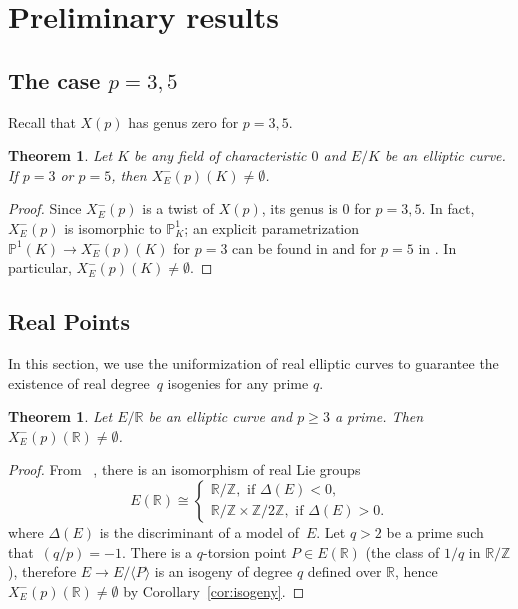 \documentclass[12pt]{amsart}
\numberwithin{equation}{section}
\newtheorem{theorem}[equation]{Theorem}
\theoremstyle{definition}
\newcommand{\PP}{\mathbb{P}}
\newcommand{\R}{\mathbb{R}}
\newcommand{\Z}{\mathbb{Z}}
\newcommand{\Xp}{X_E^{-}(p)}
\begin{document}
\section{Preliminary results}

\subsection{The case \texorpdfstring{$p=3,5$}{}}\label{sec:p=3,5}
Recall that $X(p)$ has genus zero for $p=3,5$.

\begin{theorem}\label{thm:p=3}
Let $K$ be any field of characteristic $0$ and $E/K$ be an elliptic curve.
If $p=3$ or $p=5$, then $X_E^{-}(p)(K)\neq \emptyset$.
\end{theorem}
\begin{proof}
Since $\Xp$ is a twist of $X(p)$, its genus is 0 for $p=3,5$. In fact, $\Xp$ is isomorphic to $\PP^1_K$; 
an explicit parametrization $\mathbb P^1(K)\to   X_E^{-}(p)(K)$ for $p=3$ can be found in \cite[\S 13]{fisher} and for $p=5$ in \cite[Theorem 5.8]{fisherp5}. In particular, $X_E^{-}(p)(K)\neq \emptyset$.
\end{proof}

\subsection{Real Points} \label{sectionreal}
In this section, we use the uniformization of real elliptic curves to guarantee the existence of real degree~$q$ isogenies for any prime $q$.
	\begin{theorem}\label{thm:real}
		Let $E/\R$ be an elliptic curve and $p \geq 3$ a prime. Then
		$\Xp(\R)\neq \emptyset$.
	\end{theorem}
	\begin{proof}
	From ~\cite[Ch V, Cor~2.3.1]{silverman}, there is an isomorphism of  real Lie groups
		\begin{equation*}
			E(\R)\cong
			\begin{cases}
				\R/\Z, \text{ if }\Delta(E)<0,\\
				\R/\Z \times \Z/2\Z, \text{ if } \Delta(E)>0.
			\end{cases}
		\end{equation*}
		where $\Delta(E)$ is the discriminant of a model of~$E$.
Let $q>2$ be a prime such that~$(q/p)=-1$. 
There is a $q$-torsion point $P \in E(\R)$ (the class of $1/q$ in $\R/\Z$), 
therefore $E \to E / \langle P \rangle$ is an isogeny of degree $q$ defined over $\R$, hence $\Xp(\R) \neq \emptyset$ by Corollary~\ref{cor:isogeny}.
	\end{proof}
\end{document}
